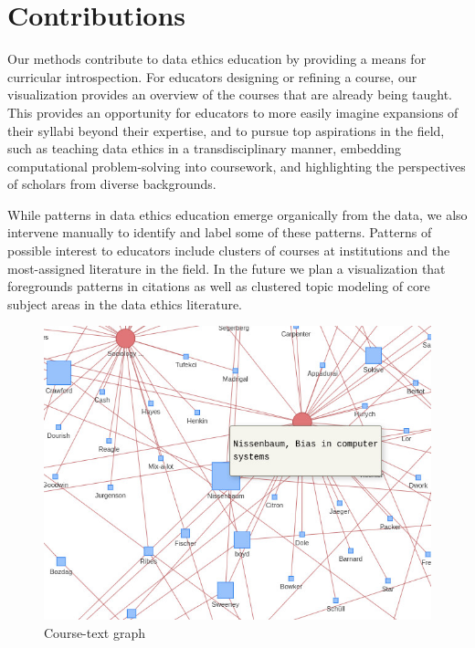 \documentclass[
]{article}
\begin{document}
\hypertarget{contributions}{%
\section{Contributions}\label{contributions}}

Our methods contribute to data ethics education by providing a means for
curricular introspection. For educators designing or refining a course,
our visualization provides an overview of the courses that are already
being taught. This provides an opportunity for educators to more easily
imagine expansions of their syllabi beyond their expertise, and to
pursue top aspirations in the field, such as teaching data ethics in a
transdisciplinary manner, embedding computational problem-solving into
coursework, and highlighting the perspectives of scholars from diverse
backgrounds.

While patterns in data ethics education emerge organically from the
data, we also intervene manually to identify and label some of these
patterns. Patterns of possible interest to educators include clusters of
courses at institutions and the most-assigned literature in the field.
In the future we plan a visualization that foregrounds patterns in
citations as well as clustered topic modeling of core subject areas in
the data ethics literature.

\begin{figure}
\hypertarget{fig:graph}{%
\centering
\includegraphics{course-text.jpg}
\caption{Course-text graph}\label{fig:graph}
}
\end{figure}
\end{document}
